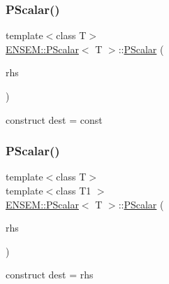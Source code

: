 \subsubsection{\texorpdfstring{PScalar()}{PScalar()}\hspace{0.1cm}{\footnotesize\ttfamily [2/12]}}
{\footnotesize\ttfamily template$<$class T$>$ \\
\mbox{\hyperlink{classENSEM_1_1PScalar}{E\+N\+S\+E\+M\+::\+P\+Scalar}}$<$ T $>$\+::\mbox{\hyperlink{classENSEM_1_1PScalar}{P\+Scalar}} (\begin{DoxyParamCaption}\item[{const typename \mbox{\hyperlink{structENSEM_1_1WordType}{Word\+Type}}$<$ T $>$\+::Type\+\_\+t \&}]{rhs }\end{DoxyParamCaption})\hspace{0.3cm}{\ttfamily [inline]}}



construct dest = const 

\mbox{\label{classENSEM_1_1PScalar_a5dad766fb1a59a9e23d03b31f22916bb}} 
\subsubsection{\texorpdfstring{PScalar()}{PScalar()}\hspace{0.1cm}{\footnotesize\ttfamily [3/12]}}
{\footnotesize\ttfamily template$<$class T$>$ \\
template$<$class T1 $>$ \\
\mbox{\hyperlink{classENSEM_1_1PScalar}{E\+N\+S\+E\+M\+::\+P\+Scalar}}$<$ T $>$\+::\mbox{\hyperlink{classENSEM_1_1PScalar}{P\+Scalar}} (\begin{DoxyParamCaption}\item[{const \mbox{\hyperlink{classENSEM_1_1PScalar}{P\+Scalar}}$<$ T1 $>$ \&}]{rhs }\end{DoxyParamCaption})\hspace{0.3cm}{\ttfamily [inline]}}



construct dest = rhs 

\mbox{\label{classENSEM_1_1PScalar_a99cdd295d67d2d32aa481a4a8d9dcc1b}} 

